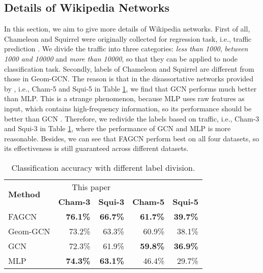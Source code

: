 \documentclass[letterpaper]{article} \usepackage{aaai21}  \usepackage{times}  \usepackage{helvet} \usepackage{courier}  \usepackage[hyphens]{url}  \usepackage{graphicx} \urlstyle{rm} \def\UrlFont{\rm}  \usepackage{natbib}  \usepackage{caption} \frenchspacing  \setlength{\pdfpagewidth}{8.5in}  \setlength{\pdfpageheight}{11in}
\begin{document}
\subsection{Details of Wikipedia Networks}

In this section, we aim to give more details of Wikipedia networks. First of all, Chameleon and Squirrel were originally collected for regression task, i.e., traffic prediction \cite{wikinet}. We divide the traffic into three categories: \emph{less than 1000}, \emph{between 1000 and 10000} and \emph{more than 10000}, so that they can be applied to node classification task. Secondly, labels of Chameleon and Squirrel are different from those in Geom-GCN. The reason is that in the disassortative networks provided by \cite{GeomGCN}, i.e., Cham-5 and Squi-5 in Table \ref{tab:compare}, we find that GCN performs much better than MLP. This is a strange phenomenon, because MLP uses raw features as input, which contains high-frequency information, so its performance should be better than GCN \cite{H2GNN}. Therefore, we redivide the labels based on traffic, i.e., Cham-3 and Squi-3 in Table \ref{tab:compare}, where the performance of GCN and MLP is more reasonable. Besides, we can see that FAGCN perform best on all four datasets, so its effectiveness is still guaranteed across different datasets.




\begin{table}[t]
  \centering
  \caption{Classification accuracy with different label division.}
    \begin{tabular}{lrrrr}
    \toprule
    \multirow{2}[4]{*}{\textbf{Method}} & \multicolumn{2}{c}{This paper} & \multicolumn{2}{c}{\cite{GeomGCN}} \\
\cmidrule(lr){2-3} \cmidrule(lr){4-5}          & \multicolumn{1}{c}{\textbf{Cham-3}} & \multicolumn{1}{c}{\textbf{Squi-3}} & \multicolumn{1}{c}{\textbf{Cham-5}} & \multicolumn{1}{c}{\textbf{Squi-5}} \\
    \midrule
    FAGCN		& \textbf{76.1\%} & \textbf{66.7\%} & \textbf{61.7\%} & \textbf{39.7\%} \\
    Geom-GCN	& 73.2\% & 63.3\% & 60.9\% & 38.1\% \\
    \midrule
    GCN   		& 72.3\% & 61.9\% & \textbf{59.8\%} & \textbf{36.9\%} \\
    MLP   		& \textbf{74.3\%} & \textbf{63.1\%} & 46.4\% & 29.7\% \\
    \bottomrule
    \end{tabular}
  \label{tab:compare}
\end{table}
\end{document}

